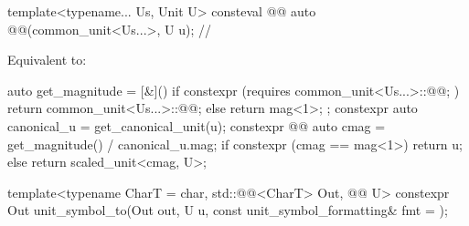 \begin{itemdecl}
template<typename... Us, Unit U>
consteval @@ auto @@(common_unit<Us...>, U u);  // \expos
\end{itemdecl}

\begin{itemdescr}
\pnum
\effects
Equivalent to:
\begin{codeblock}
auto get_magnitude = [&]() {
  if constexpr (requires { common_unit<Us...>::@@; })
    return common_unit<Us...>::@@;
  else
    return mag<1>;
};
constexpr auto canonical_u = get_canonical_unit(u);
constexpr @@ auto cmag = get_magnitude() / canonical_u.mag;
if constexpr (cmag == mag<1>)
  return u;
else
  return scaled_unit<cmag, U>{};
\end{codeblock}
\end{itemdescr}

\begin{itemdecl}
template<typename CharT = char, std::@@<CharT> Out, @@ U>
constexpr Out unit_symbol_to(Out out, U u, const unit_symbol_formatting& fmt = {});
\end{itemdecl}

